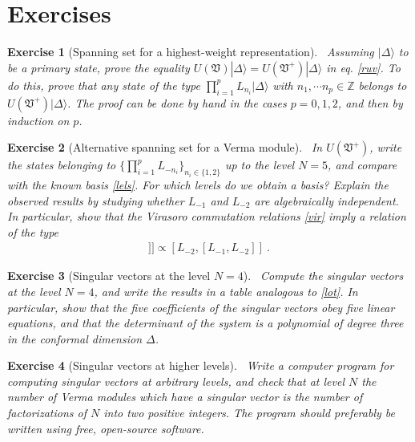 \documentclass[12pt,a4paper,notitlepage]{report}
\numberwithin{equation}{section}
\theoremstyle{break}
\newtheorem{exo}{Exercise}[chapter]
\begin{document}
\section{Exercises}

\begin{exo}[Spanning set for a highest-weight representation]
 ~\label{exospan}
Assuming $|\Delta\rangle$ to be a primary state, prove the equality $U(\mathfrak{V})|\Delta\rangle =U(\mathfrak{V}^+)|\Delta\rangle$ in eq. \eqref{ruv}.
To do this, prove that any state of the type $\prod_{i=1}^p L_{n_i}|\Delta\rangle$ with $n_1,\cdots n_p\in {\mathbb{Z}}$ belongs to $U(\mathfrak{V}^+)|\Delta\rangle$.
The proof can be done by hand in the cases $p=0,1,2$, and then by induction on $p$.
\end{exo}

\begin{exo}[Alternative spanning set for a Verma module]
 ~\label{exoot}
In $U(\mathfrak{V}^+)$, write the states belonging to  $\{\prod_{i=1}^p L_{-n_i}\}_{n_i\in\{1,2\}}$ up to the level $N=5$, and compare with the known basis \eqref{lels}.
For which levels do we obtain a basis? Explain the observed results by studying whether $L_{-1}$ and $L_{-2}$ are algebraically independent.
In particular, show that the Virasoro commutation relations \eqref{vir} imply a relation of the type
\begin{align}
 [L_{-1},[L_{-1},[L_{-1},L_{-2}]]] \propto [L_{-2},[L_{-1},L_{-2}]]\ .
\end{align}
\end{exo}

\begin{exo}[Singular vectors at the level $N=4$]
~\label{exolf}
 Compute the singular vectors at the level $N=4$, and write the results in a table analogous to \eqref{lot}.
In particular, show that the five coefficients of the singular vectors obey five linear equations, and that the determinant of the system is a polynomial of degree three in the conformal dimension $\Delta$. 
\end{exo}

\begin{exo}[Singular vectors at higher levels]
~\label{exohl}
 Write a computer program for computing singular vectors at arbitrary levels, and check that at level $N$ the number of Verma modules which have a singular vector is the number of factorizations of $N$ into two positive integers.
The program should preferably be written using free, open-source software.
\end{exo}
\end{document}
